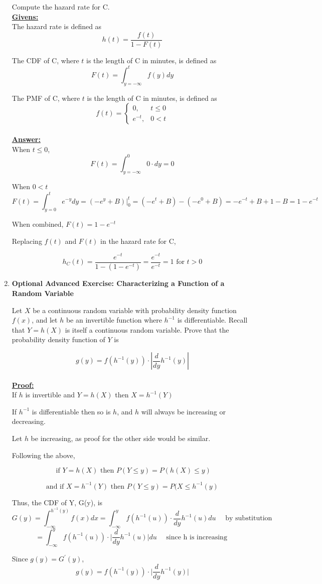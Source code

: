 \documentclass[12pt,a4paper]{article}
\numberwithin{equation}{subsection}
\begin{document}
\begin{enumerate}
Compute the hazard rate for C.
\\
\textbf{\underline{Givens:}}
\\
The hazard rate is defined as
$$h(t) = \frac{f(t)}{1-F(t)}$$

The CDF of C, where $t$ is the length of C in minutes, is defined as
$$F(t) = \int_{y=-\infty}^{t} f(y) dy$$

The PMF of C, where $t$ is the length of C in minutes, is defined as
$$f(t) = \begin{cases} 0, &t \leq 0 \\
e^{-t}, &0 < t
\end{cases}
$$
\\
\textbf{\underline{Answer:}}
\\
When $t \leq 0$,
$$F(t) = \int_{y=-\infty}^{0}  0 \cdot dy = 0$$

When $0 < t$
$$F(t) = \int_{y=0}^{t} e^{-y} dy = (-e^y + B)\bigg|_0^t = (-e^t + B) - (-e^0 + B) = -e^{-t} + B + 1 - B = 1 - e^{-t}$$

When combined, $F(t) = 1 - e^{-t}$

Replacing $f(t)$ and $F(t)$ in the hazard rate for C,

$$ h_C(t) = \frac{e^{-t}}{1 - (1 - e^{-t})} = \frac{e^{-t}}{e^{-t}} = 1 \text{ for } t > 0$$

\item \textbf{Optional Advanced Exercise: Characterizing a Function of a Random Variable}

Let $X$ be a continuous random variable with probability density function $f(x)$, and let $h$ be an invertible function where $h^{-1}$ is differentiable.  Recall that $Y = h(X)$ is itself a continuous random variable.  Prove that the probability density function of $Y$ is 

$$g(y) =f(h^{-1}(y)) \cdot \left| \frac{d}{dy}h^{-1}(y) \right| $$
\\
\textbf{\underline{Proof:}}
\\
If $h$ is invertible and $Y = h(X)$ then $X = h^{-1}(Y)$

If $h^{-1}$ is differentiable then so is $h$, and $h$ will always be increasing or decreasing.

Let $h$ be increasing, as proof for the other side would be similar.

Following the above,

$$\text{    if }Y = h(X) \text{   then } P(Y \leq y) = P(h(X) \leq y)$$

$$\text{and if } X = h^{-1}(Y)  \text{ then } P(Y \leq y) = P(X \leq h^{-1}(y)$$

Thus, the CDF  of Y, G(y), is
$$ G(y) = \int_{-\infty}^{h^{-1}(y)}f(x)dx = \int_{-\infty}^{y}f(h^{-1}(u)) \cdot \frac{d}{dy}h^{-1}(u)du \quad \text{ by substitution }$$
$$ = \int_{-\infty}^{y}f(h^{-1}(u)) \cdot \bigg|\frac{d}{dy}h^{-1}(u)\bigg|du \quad \text{ since h is increasing }$$

Since $g(y) = G^{'}(y)$,
$$g(y) = f(h^{-1}(y)) \cdot \bigg|\frac{d}{dy}h^{-1}(y)\bigg|$$


\end{enumerate}
\end{document}
